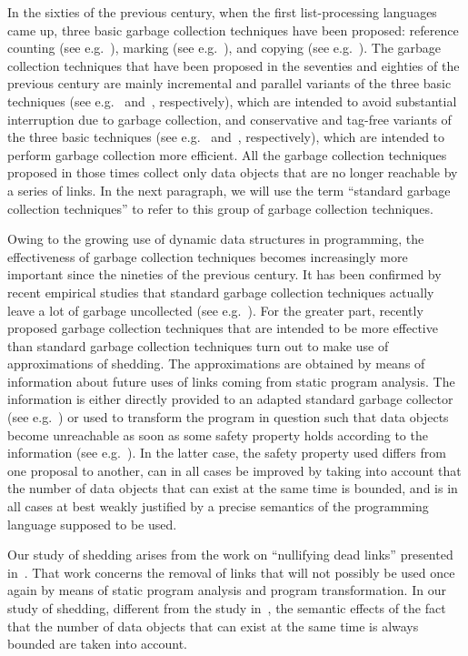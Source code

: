 \documentclass[fleqn]{llncs}
\begin{document}
In the sixties of the previous century, when the first list-processing
languages came up, three basic garbage collection techniques have been
proposed: reference counting (see e.g.~\cite{GHG60a,Col60a}), marking
(see e.g.~\cite{McC60a,SW67a}), and copying (see
e.g.~\cite{Min63a,FY69a}).
The garbage collection techniques that have been proposed in the
seventies and eighties of the previous century are mainly incremental
and parallel variants of the three basic techniques (see
e.g.~\cite{Bak78a,LH83a} and~\cite{Ste75a,KS77a,DLMSS78a},
respectively), which are intended to avoid substantial interruption due
to garbage collection, and conservative and tag-free variants of the
three basic techniques (see e.g.~\cite{BW88a} and~\cite{App89,Gol91a},
respectively), which are intended to perform garbage collection more
efficient.
All the garbage collection techniques proposed in those times collect
only data objects that are no longer reachable by a series of links.
In the next paragraph, we will use the term ``standard garbage
collection techniques'' to refer to this group of garbage collection
techniques.

Owing to the growing use of dynamic data structures in programming, the
effectiveness of garbage collection techniques becomes increasingly more
important since the nineties of the previous century.
It has been confirmed by recent empirical studies that standard garbage
collection techniques actually leave a lot of garbage uncollected (see
e.g.~\cite{SKS00a,SKS01a,HDH02a}).
For the greater part, recently proposed garbage collection techniques
that are intended to be more effective than standard garbage collection
techniques turn out to make use of approximations of shedding.
The approximations are obtained by means of information about future
uses of links coming from static program analysis.
The information is either directly provided to an adapted standard
garbage collector (see e.g.~\cite{ADM98a}) or used to transform the
program in question such that data objects become unreachable as soon as
some safety property holds according to the information (see
e.g.~\cite{SYKS05a,KSK07a}).
In the latter case, the safety property used differs from one proposal
to another, can in all cases be improved by taking into account that the
number of data objects that can exist at the same time is bounded, and
is in all cases at best weakly justified by a precise semantics of the
programming language supposed to be used.

Our study of shedding arises from the work on ``nullifying dead links''
presented in~\cite{KSK07a}.
That work concerns the removal of links that will not possibly be used
once again by means of static program analysis and program
transformation.
In our study of shedding, different from the study in~\cite{KSK07a},
the semantic effects of the fact that the number of data objects that
can exist at the same time is always bounded are taken into account.
\end{document}
